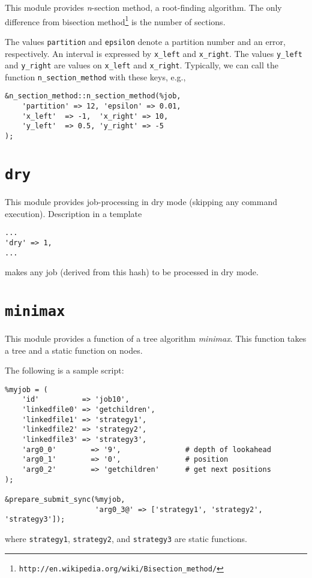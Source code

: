 \documentclass[a4paper,10pt]{report}
\begin{document}
This module provides \textit{n}-section method, a root-finding
algorithm. The only difference from bisection
method\footnote{\texttt{http://en.wikipedia.org/wiki/Bisection\_method/}}
is the number of sections.

The values \texttt{partition} and \texttt{epsilon} denote
    a partition number and an error, respectively.  An interval is
    expressed by \texttt{x\_left} and \texttt{x\_right}.  The values
    \texttt{y\_left} and \texttt{y\_right} are values on \texttt{x\_left}
    and \texttt{x\_right}.  Typically, we can call the function
    \texttt{n\_section\_method} with these keys, e.g.,
\begin{boxnote}
\begin{verbatim}
&n_section_method::n_section_method(%job,
    'partition' => 12, 'epsilon' => 0.01,
    'x_left'  => -1,  'x_right' => 10,
    'y_left'  => 0.5, 'y_right' => -5
);
\end{verbatim}
\end{boxnote}

\section{\texttt{dry}}

This module provides job-processing in dry mode (skipping any command
execution).  Description in a template
\begin{boxnote}
\begin{verbatim}
...
'dry' => 1,
...
\end{verbatim}
\end{boxnote}
\noindent
makes any job (derived from this hash) to be processed in dry mode.


\section{\texttt{minimax}}

This module provides a function of a tree algorithm \textit{minimax}.
This function takes a tree and a static function on nodes.

The following is a sample script:
\begin{boxnote}
\begin{verbatim}
%myjob = (
    'id'          => 'job10',
    'linkedfile0' => 'getchildren',
    'linkedfile1' => 'strategy1',
    'linkedfile2' => 'strategy2',
    'linkedfile3' => 'strategy3',
    'arg0_0'        => '9',               # depth of lookahead
    'arg0_1'        => '0',               # position
    'arg0_2'        => 'getchildren'      # get next positions
);

&prepare_submit_sync(%myjob,
                     'arg0_3@' => ['strategy1', 'strategy2', 'strategy3']);
\end{verbatim}
\end{boxnote}
\noindent
where \texttt{strategy1}, \texttt{strategy2}, and
\texttt{strategy3} are static functions.
\end{document}
